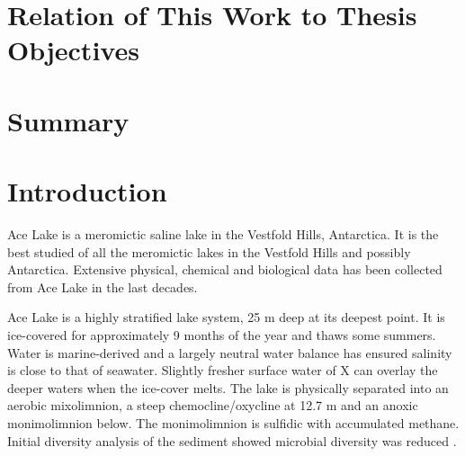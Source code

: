 \section*{Relation of This Work to Thesis Objectives}

\section{Summary}



\section{Introduction}
Ace Lake is a meromictic saline lake in the Vestfold Hills, Antarctica. 
It is the best studied of all the meromictic lakes in the Vestfold Hills and possibly Antarctica.
Extensive physical, chemical and biological data has been collected from Ace Lake in the last decades.

Ace Lake is a highly stratified lake system, 25 m deep at its deepest point.
It is ice-covered for approximately 9 months of the year and thaws some summers. %
Water is marine-derived and a largely neutral water balance has ensured salinity is close to that of seawater.
Slightly fresher surface water of X can overlay the deeper waters when the ice-cover melts.
The lake is physically separated into an aerobic mixolimnion, a steep chemocline/oxycline at 12.7 m and an anoxic monimolimnion below.
The monimolimnion is sulfidic with accumulated methane.
Initial diversity analysis of the sediment showed microbial diversity was reduced \cite{Bowman2000}.

